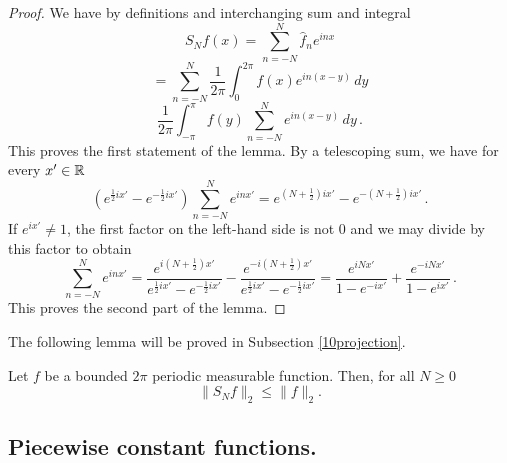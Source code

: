 {\begin{proof}
We have by definitions and interchanging sum and integral
   \begin{equation*}
        S_Nf(x)=\sum_{n=-N}^N \widehat{f}_n e^{inx}
    \end{equation*}
       \begin{equation*}
    =\sum_{n=-N}^N \frac 1{2\pi}\int_{0}^{2\pi}
    f(x) e^{in(x-y)}\, dy
    \end{equation*}
 \begin{equation}\label{eq expsum}
     \frac 1{2\pi}\int_{-\pi}^\pi
    f(y) \sum_{n=-N}^N e^{in(x-y)}\, dy\, .
 \end{equation}
This proves the first statement of the lemma.
By a telescoping sum, we have for every $x'\in \mathbb{R}$
\begin{equation}
    \left( e^{\frac 12 ix'}-e^{-\frac 12 ix'}\right)  \sum_{n=-N}^N e^{inx'}= e^{(N+\frac 12) ix'}-e^{-(N+\frac 12) ix'}\, .
\end{equation}
If $e^{ix'}\neq 1$, the first factor on the left-hand side is not $0$ and we may divide by this factor to obtain
\begin{equation}
      \sum_{n=-N}^N e^{inx'}= \frac{e^{i(N+\frac 1 2)x'}}{e^{\frac 12 ix'}-e^{-\frac 12ix'}}
      -\frac{e^{-i(N+\frac 1 2)x'}}{e^{\frac 12 ix'}-e^{-\frac 12ix'}}
       =\frac{e^{iNx'}}{1-e^{-ix'}}
      +\frac {e^{-iNx'}}{1-e^{ix'}}\, .
\end{equation}
This  proves the second part of the lemma.
\end{proof}

The following lemma will be proved in Subsection \ref{10projection}.

\begin{lemma}\label{lem l2sn}
    Let $f$ be a bounded $2\pi$ periodic measurable function. Then, for all $N\ge 0$
   \begin{equation}\label{snbound}
   \|S_Nf\|_2\le \|f\|_2.
   \end{equation}
\end{lemma}





\subsection{Piecewise constant functions.}
\label{10piecewise}









}
